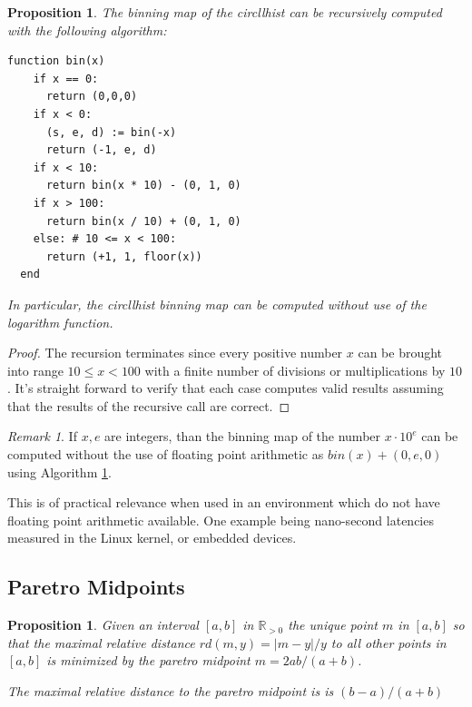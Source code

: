 \documentclass{article}
\theoremstyle{plain}
\newtheorem{proposition}[definition]{Proposition}
\theoremstyle{remark}
\newtheorem{remark}[definition]{Remark}
\newcommand{\IR}{\mathbb{R}}
\begin{document}
\begin{proposition} \label{prop:rec}
  The binning map of the circllhist can be recursively computed with the following algorithm:

  \begin{cetner}
    \begin{BVerbatim}[fontfamily=tt]
  function bin(x)
    if x == 0:
      return (0,0,0)
    if x < 0:
      (s, e, d) := bin(-x)
      return (-1, e, d)
    if x < 10:
      return bin(x * 10) - (0, 1, 0)
    if x > 100:
      return bin(x / 10) + (0, 1, 0)
    else: # 10 <= x < 100:
      return (+1, 1, floor(x))
  end
    \end{BVerbatim}
  \end{cetner}

  In particular, the circllhist binning map can be computed without use of the logarithm function.
\end{proposition}

\begin{proof}
  The recursion terminates since every positive number $x$ can be brought into range $10 \leq x <
  100$ with a finite number of divisions or multiplications by $10$.  It's straight forward to
  verify that each case computes valid results assuming that the results of the recursive call are
  correct.
\end{proof}

\begin{remark}
  If $x,e$ are integers, than the binning map of the number $x \cdot 10^{e}$ can be computed without
  the use of floating point arithmetic as $bin(x) + (0,e,0)$ using Algorithm \ref{prop:rec}.

  This is of practical relevance when used in an environment which do not have floating
  point arithmetic available. One example being nano-second latencies measured in the Linux kernel,
  or embedded devices.
\end{remark}

\subsection{Paretro Midpoints}

\begin{proposition} \label{prop:pdist}
  Given an interval $[a,b]$ in $\IR_{>0}$ the unique point $m$ in $[a,b]$ so that the maximal
  relative distance $rd(m, y) = |m-y|/y$ to all other points in $[a,b]$ is minimized
  by the paretro midpoint
  $m = 2ab / (a + b)$.

  The maximal relative distance to the paretro midpoint is is $(b - a) / (a + b)$
\end{proposition}
\end{document}
